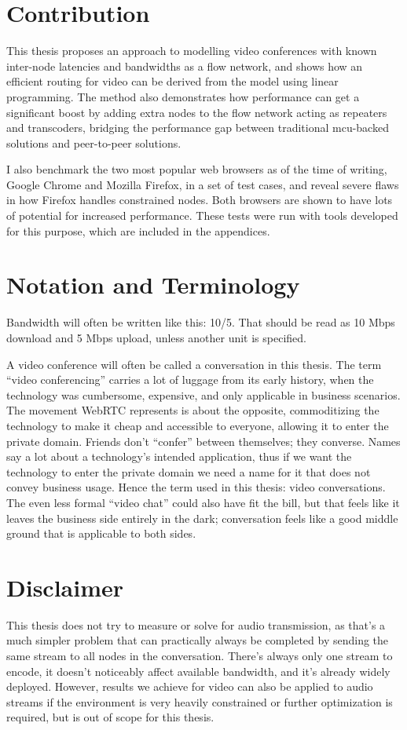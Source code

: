 \section{Contribution}

This thesis proposes an approach to modelling video conferences with known inter-node latencies and bandwidths as a flow network, and shows how an efficient routing for video can be derived from the model using linear programming. The method also demonstrates how performance can get a significant boost by adding extra nodes to the flow network acting as repeaters and transcoders, bridging the performance gap between traditional \gls{mcu}-backed solutions and peer-to-peer solutions.

I also benchmark the two most popular web browsers as of the time of writing, Google Chrome and Mozilla Firefox, in a set of test cases, and reveal severe flaws in how Firefox handles constrained nodes. Both browsers are shown to have lots of potential for increased performance. These tests were run with tools developed for this purpose, which are included in the appendices.


\section{Notation and Terminology}

Bandwidth will often be written like this: 10/5. That should be read as 10 Mbps download and 5 Mbps upload, unless another unit is specified.

A video conference will often be called a conversation in this thesis. The term ``video conferencing'' carries a lot of luggage from its early history, when the technology was cumbersome, expensive, and only applicable in business scenarios. The movement WebRTC represents is about the opposite, commoditizing the technology to make it cheap and accessible to everyone, allowing it to enter the private domain. Friends don't ``confer'' between themselves; they converse. Names say a lot about a technology's intended application, thus if we want the technology to enter the private domain we need a name for it that does not convey business usage. Hence the term used in this thesis: video conversations. The even less formal ``video chat'' could also have fit the bill, but that feels like it leaves the business side entirely in the dark; conversation feels like a good middle ground that is applicable to both sides.


\section{Disclaimer}

This thesis does not try to measure or solve for audio transmission, as that's a much simpler problem that can practically always be completed by sending the same stream to all nodes in the conversation. There's always only one stream to encode, it doesn't noticeably affect available bandwidth, and it's already widely deployed. However, results we achieve for video can also be applied to audio streams if the environment is very heavily constrained or further optimization is required, but is out of scope for this thesis.
